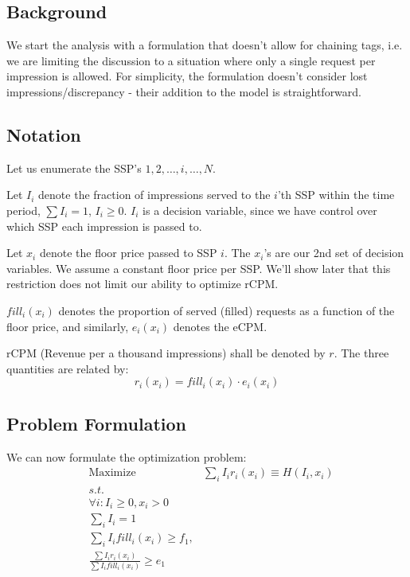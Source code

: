 \documentclass{article}
\begin{document}
\begin{large}
\subsection{Background}
We start the analysis with a formulation that doesn't allow for chaining tags, i.e. we are limiting the discussion to a situation where only a single request per impression is allowed. For simplicity, the formulation doesn't consider lost impressions/discrepancy - their addition to the model is straightforward. 

\subsection{Notation}
Let us enumerate the SSP's  $1,2, \dots, i, \dots, N$.

Let $I_i$ denote the fraction of impressions served to the $i$'th SSP within the time period, $\sum{I_i}=1$, $I_i \geq 0$. $I_i$ is a decision variable, since we have control over which SSP each impression is passed to.

Let $x_i$ denote the floor price passed to SSP $i$. The $x_i$'s are our 2nd set of decision variables. We assume a constant floor price per SSP. We'll show later that this restriction does not limit our ability to optimize rCPM.

$fill_{i}(x_{i})$ denotes the proportion of served (filled) requests as a function of the floor price, and similarly, $e_{i}(x_{i})$ denotes the eCPM.

rCPM (Revenue per a thousand impressions) shall be denoted by $r$. The three quantities are related by: 
\begin{equation}
r_i(x_i)=fill_i(x_i)\cdot e_i(x_i)
\end{equation}


\subsection{Problem Formulation}

We can now formulate the optimization problem:
\begin{equation}
\begin{aligned}
&\text{Maximize} &\sum_{i}{I_i r_i(x_i)} \equiv H(I_i,x_i)\\
&s.t. \\ 
&\forall i: I_i \geq 0 , x_i > 0\\
&\sum_{i}{I_i}=1\\
&\sum_{i}{I_i fill_i(x_i)} \geq f_1,\\ 
&\frac{\sum{I_i r_i(x_i)}}{\sum{I_i fill_i(x_i)}} \geq e_1\\
\end{aligned} 
\end{equation}


\end{large}
\end{document}
